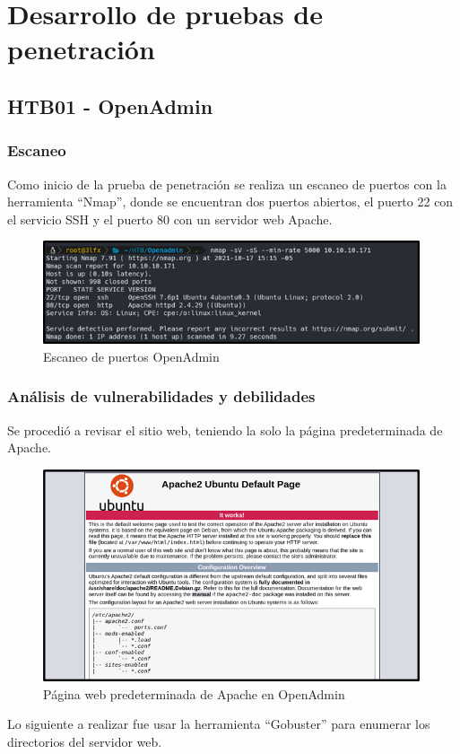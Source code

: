 \section{Desarrollo de pruebas de penetración}
\subsection{HTB01 - OpenAdmin}
\subsubsection{Escaneo}
Como inicio de la prueba de penetración se realiza un escaneo de puertos con la herramienta “Nmap”, donde se encuentran dos puertos abiertos, el puerto 22 con el servicio SSH y el puerto 80 con un servidor web Apache.
\begin{figure}[H]
    \centering
    \includegraphics[width=0.99\textwidth]{imagenes/scanopen.png}
    \caption{Escaneo de puertos OpenAdmin}
\end{figure}
\subsubsection{Análisis de vulnerabilidades y debilidades}
Se procedió a revisar el sitio web, teniendo la solo la página predeterminada de Apache.
\begin{figure}[H]
    \centering
    \includegraphics[width=0.99\textwidth]{imagenes/apapred.png}
    \caption{Página web predeterminada de Apache en OpenAdmin}
\end{figure}
Lo siguiente a realizar fue usar la herramienta “Gobuster” para enumerar los directorios del servidor web.

